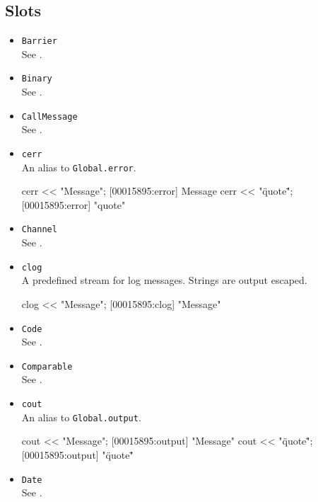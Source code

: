\subsection{Slots}
\begin{itemize}
\item \lstinline|Barrier|\\
  See .

\item \lstinline|Binary|\\
  See .

\item \lstinline|CallMessage|\\
  See .

\item \lstinline|cerr|\\
  An alias to \lstinline|Global.error|.
\begin{urbiscript}
cerr << "Message";
[00015895:error] Message
cerr << "\"quote\"";
[00015895:error] "quote"
\end{urbiscript}

\item \lstinline|Channel|\\
  See .

\item \lstinline|clog|\\
  A predefined stream for log messages.  Strings are output escaped.
\begin{urbiscript}
clog << "Message";
[00015895:clog] "Message"
\end{urbiscript}

\item \lstinline|Code|\\
  See .

\item \lstinline|Comparable|\\
  See .

\item \lstinline|cout|\\
  An alias to \lstinline|Global.output|.
\begin{urbiscript}
cout << "Message";
[00015895:output] "Message"
cout << "\"quote\"";
[00015895:output] "\"quote\""
\end{urbiscript}

\item \lstinline|Date|\\
  See .


\end{itemize}
